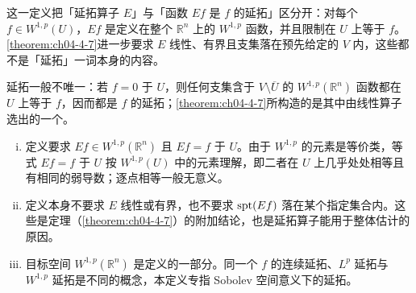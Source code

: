 \documentclass[../../main.tex]{subfiles}%
\begin{document}
\begin{remark}\label{remark:ch04-def-4-6-动机}
这一定义把「延拓算子 $E$」与「函数 $Ef$ 是 $f$ 的延拓」区分开：对每个 $f\in W^{1,p}(U)$，$Ef$ 是定义在整个 $\mathbb{R}^n$ 上的 $W^{1,p}$ 函数，并且限制在 $U$ 上等于 $f$。\cref{theorem:ch04-4-7}进一步要求 $E$ 线性、有界且支集落在预先给定的 $V$ 内，这些都不是「延拓」一词本身的内容。%

延拓一般不唯一：若 $f=0$ 于 $U$，则任何支集含于 $V\setminus\overline{U}$ 的 $W^{1,p}(\mathbb{R}^n)$ 函数都在 $U$ 上等于 $f$，因而都是 $f$ 的延拓；\cref{theorem:ch04-4-7}所构造的是其中由线性算子选出的一个。%
\end{remark}

\begin{remark}\label{remark:ch04-def-4-6-条件}
\begin{enumerate}[(i)]
\item 定义要求 $Ef\in W^{1,p}(\mathbb{R}^n)$ 且 $Ef=f$ 于 $U$。由于 $W^{1,p}$ 的元素是等价类，等式 $Ef=f$ 于 $U$ 按 $W^{1,p}(U)$ 中的元素理解，即二者在 $U$ 上几乎处处相等且有相同的弱导数；逐点相等一般无意义。
\item 定义本身不要求 $E$ 线性或有界，也不要求 $\operatorname{spt}(Ef)$ 落在某个指定集合内。这些是定理（\cref{theorem:ch04-4-7}）的附加结论，也是延拓算子能用于整体估计的原因。%
\item 目标空间 $W^{1,p}(\mathbb{R}^n)$ 是定义的一部分。同一个 $f$ 的连续延拓、$L^p$ 延拓与 $W^{1,p}$ 延拓是不同的概念，本定义专指 Sobolev 空间意义下的延拓。
\end{enumerate}
\end{remark}
\end{document}
